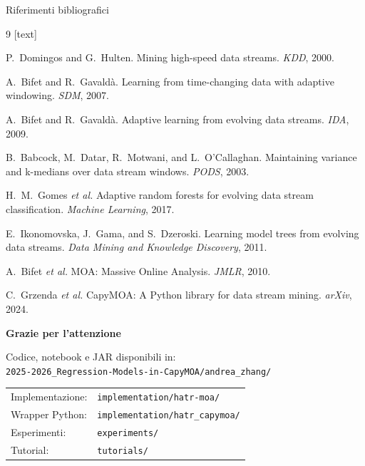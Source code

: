 \documentclass[aspectratio=169,10pt]{beamer}
\begin{document}
\begin{frame}[allowframebreaks]{Riferimenti bibliografici}
  \begin{thebibliography}{9}
    [text]

    P.~Domingos and G.~Hulten.
    \newblock Mining high-speed data streams.
    \newblock \emph{KDD}, 2000.

    A.~Bifet and R.~Gavaldà.
    \newblock Learning from time-changing data with adaptive windowing.
    \newblock \emph{SDM}, 2007.

    A.~Bifet and R.~Gavaldà.
    \newblock Adaptive learning from evolving data streams.
    \newblock \emph{IDA}, 2009.

    B.~Babcock, M.~Datar, R.~Motwani, and L.~O'Callaghan.
    \newblock Maintaining variance and k-medians over data stream windows.
    \newblock \emph{PODS}, 2003.

    H.~M.~Gomes \emph{et al.}
    \newblock Adaptive random forests for evolving data stream classification.
    \newblock \emph{Machine Learning}, 2017.

    E.~Ikonomovska, J.~Gama, and S.~Dzeroski.
    \newblock Learning model trees from evolving data streams.
    \newblock \emph{Data Mining and Knowledge Discovery}, 2011.

    A.~Bifet \emph{et al.}
    \newblock MOA: Massive Online Analysis.
    \newblock \emph{JMLR}, 2010.

    C.~Grzenda \emph{et al.}
    \newblock CapyMOA: A Python library for data stream mining.
    \newblock \emph{arXiv}, 2024.
  \end{thebibliography}
\end{frame}

\begin{frame}
  \begin{center}
    \Large\textbf{Grazie per l'attenzione}

    \bigskip
    \normalsize
    Codice, notebook e JAR disponibili in:\\
    \texttt{2025-2026\_Regression-Models-in-CapyMOA/andrea\_zhang/}

    \bigskip
    \begin{tabular}{ll}
      Implementazione: & \texttt{implementation/hatr-moa/} \\
      Wrapper Python:  & \texttt{implementation/hatr\_capymoa/} \\
      Esperimenti:     & \texttt{experiments/} \\
      Tutorial:        & \texttt{tutorials/} \\
    \end{tabular}
  \end{center}
\end{frame}
\end{document}
